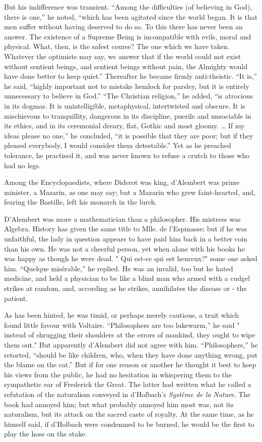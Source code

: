 \documentclass[]{book}
\begin{document}
But his indifference was transient. ``Among the difficulties (of
believing in God), there is one,'' he noted, ``which has been agitated
since the world began. It is that men suffer without having deserved to
do so. To this there has never been an answer. The existence of a
Supreme Being is incompatible with evils, moral and physical. What,
then, is the safest course? The one which we have taken. Whatever the
optimists may say, we answer that if the world could not exist without
sentient beings, and sentient beings without pain, the Almighty would
have done better to keep quiet.'' Thereafter he became firmly
anti-theistic. ``It is,'' he said, ``highly important not to mistake
hemlock for parsley, but it is entirely unnecessary to believe in God.''
``The Christian religion,'' he added, ``is atrocious in its dogmas. It
is unintelligible, metaphysical, intertwisted and obscure. It is
mischievous to tranquillity, dangerous in its discipline, puerile and
unsociable in its ethics, and in its ceremonial dreary, flat, Gothic and
most gloomy. \ldots{} If my ideas please no one,'' he concluded, ``it is
possible that they are poor; but if they pleased everybody, I would
consider them detestable.'' Yet as he preached tolerance, he practised
it, and was never known to refuse a crutch to those who had no legs.

Among the Encyclopaedists, where Diderot was king, d'Alembert was prime
minister, a Mazarin, as one may say; but a Mazarin who grew
faint-hearted, and, fearing the Bastille, left his monarch in the lurch.

D'Alembert was more a mathematician than a philosopher. His mistress was
Algebra. History has given the same title to Mlle. de l'Espinasse; but
if he was unfaithful, the lady in question appears to have paid him back
in a better coin than his own. He was not a cheerful person, yet when
alone with his books he was happy as though he were dead. " Qui est-ce
qui est heureux?" some one asked him. ``Quelque misérable,'' he replied.
He was an invalid, too but he hated medicine, and held a physician to be
like a blind man who armed with a cudgel strikes at random, and,
according as he strikes, annihilates the disease or - the patient.

As has been hinted, he was timid, or perhaps merely cautious, a trait
which found little favour with Voltaire. ``Philosophers are too
lukewarm,'' he said " instead of shrugging their shoulders at the errors
of mankind, they ought to wipe them out." But apparently d'Alembert did
not agree with him. ``Philosophers,'' he retorted, ``should be like
children, who, when they have done anything wrong, put the blame on the
cat.'' But if for one reason or another he thought it best to keep his
views from the public, he had no hesitation in whispering them to the
sympathetic ear of Frederick the Great. The latter had written what he
called a refutation of the naturalism conveyed in d'Holbach's
\emph{Système de la Nature}. The book had annoyed him; but what probably
annoyed him most was, not its naturalism, but its attack on the sacred
caste of royalty. At the same time, as he himself said, if d'Holbach
were condemned to be burned, he would be the first to play the hose on
the stake.
\end{document}
